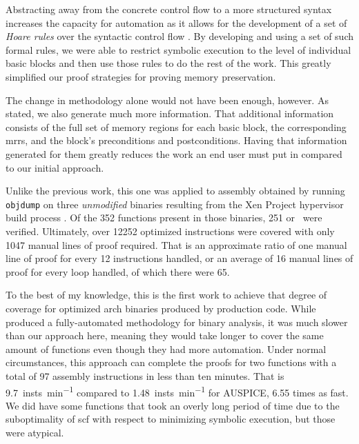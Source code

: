 Abstracting away from the concrete control flow to a more structured syntax
increases the capacity for automation
as it allows for the development of a set of \emph{Hoare rules}
over the syntactic control flow \autocite{hoare1969axiomatic}.
By developing and using a set of such formal rules, we were able to restrict symbolic execution
to the level of individual basic blocks and then use those rules to do the rest of the work.
This greatly simplified our proof strategies for proving memory preservation.

The change in methodology alone would not have been enough, however.
As stated, we also generate much more information.
That additional information consists of the full set of memory regions
for each basic block, the corresponding \acp{mrr},
and the block's preconditions and postconditions.
Having that information generated for them greatly reduces the work an end user
must put in compared to our initial approach.

Unlike the previous work, this one was applied to assembly obtained
by running \texttt{objdump} on three \emph{unmodified} binaries resulting from the
Xen Project hypervisor build process \autocite{chisnall2008definitive}.
Of the \num{352} functions present in those binaries,
\num{251} or \xenpercentage\ were verified.
Ultimately, over \num{12252} optimized instructions were covered
with only \num{1047} manual lines of proof required.
That is an approximate ratio of one manual line of proof
for every \num{12} instructions handled,
or an average of \num{16} manual lines of proof for every loop handled,
of which there were \num{65}.

To the best of my knowledge, this is the first work to achieve
that degree of coverage for optimized \gls{arch} binaries produced by production code.
While \textcite{tan2015auspice} produced a fully-automated methodology
for binary analysis, it was much slower than our approach here,
meaning they would take longer to cover the same amount of functions
even though they had more automation.
Under normal circumstances, this approach can complete the proofs for two functions
with a total of \num{97} assembly instructions in less than ten minutes.
That is \SI{9.7}{insts\per\minute} compared to \SI{1.48}{insts\per\minute}
for AUSPICE, \num{6.55} times as fast. We did have some functions that took
an overly long period of time due to the suboptimality of \acl*{scf}
with respect to minimizing symbolic execution, but those were atypical.

